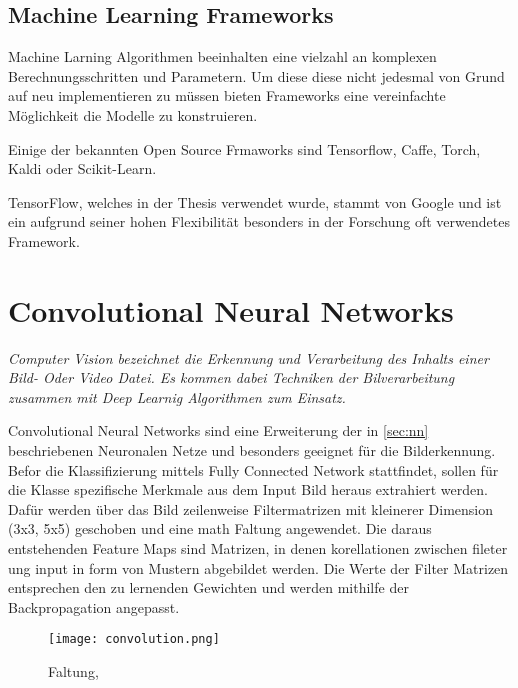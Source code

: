 \subsection{Machine Learning Frameworks}

Machine Larning Algorithmen beeinhalten eine vielzahl an komplexen
Berechnungsschritten und Parametern. Um diese diese nicht jedesmal 
von Grund auf neu implementieren zu müssen bieten 
Frameworks eine vereinfachte Möglichkeit die Modelle zu konstruieren.

Einige der bekannten Open Source Frmaworks sind Tensorflow,
Caffe, Torch, Kaldi oder Scikit-Learn.

TensorFlow, welches in der Thesis verwendet wurde, stammt von 
Google und ist ein aufgrund seiner hohen Flexibilität besonders 
in der Forschung oft verwendetes Framework.





\section{Convolutional Neural Networks}\label{subsec:cnn}

\textit{
Computer Vision bezeichnet die Erkennung und 
Verarbeitung des Inhalts einer Bild- Oder Video 
Datei. Es kommen dabei Techniken der Bilverarbeitung
zusammen mit Deep Learnig Algorithmen zum Einsatz.
}



Convolutional Neural Networks sind eine Erweiterung 
der in \ref{sec:nn} beschriebenen Neuronalen Netze 
und besonders geeignet für die Bilderkennung.
Befor die Klassifizierung mittels Fully Connected Network 
stattfindet, sollen für die Klasse spezifische Merkmale 
aus dem Input Bild heraus extrahiert werden.
Dafür werden über das Bild zeilenweise Filtermatrizen mit kleinerer Dimension
(3x3, 5x5) geschoben und eine math Faltung angewendet.
Die daraus entstehenden Feature Maps sind Matrizen, in denen 
korellationen zwischen fileter ung input in form von 
Mustern abgebildet werden.
Die Werte der Filter Matrizen entsprechen den zu lernenden Gewichten 
und werden mithilfe der Backpropagation angepasst.

\begin{figure}[H]
    \centering
    \label{fig:conv}
    \texttt{[image: convolution.png]}
    \caption{Faltung, \cite{researcherSimpleIntroductionConvolutional2019}}
\end{figure}


